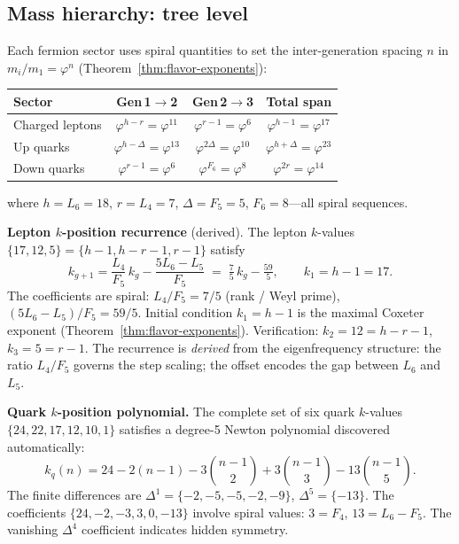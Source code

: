 \documentclass[12pt,a4paper]{article}
\begin{document}
\subsection{Mass hierarchy: tree level}

Each fermion sector uses spiral quantities to set the inter-generation spacing $n$ in $m_i/m_1 = \varphi^n$ (Theorem~\ref{thm:flavor-exponents}):

\begin{center}
\begin{tabular}{|l|cc|c|}
\hline
\textbf{Sector} & Gen\,1$\to$2 & Gen\,2$\to$3 & Total span \\
\hline
Charged leptons & $\varphi^{h-r} = \varphi^{11}$ & $\varphi^{r-1} = \varphi^{6}$ & $\varphi^{h-1} = \varphi^{17}$ \\
Up quarks & $\varphi^{h-\Delta} = \varphi^{13}$ & $\varphi^{2\Delta} = \varphi^{10}$ & $\varphi^{h+\Delta} = \varphi^{23}$ \\
Down quarks & $\varphi^{r-1} = \varphi^{6}$ & $\varphi^{F_6} = \varphi^{8}$ & $\varphi^{2r} = \varphi^{14}$ \\
\hline
\end{tabular}
\end{center}

\noindent where $h = L_6 = 18$, $r = L_4 = 7$, $\Delta = F_5 = 5$, $F_6 = 8$---all spiral sequences.

\textbf{Lepton $k$-position recurrence} (derived). The lepton $k$-values $\{17, 12, 5\} = \{h{-}1, h{-}r{-}1, r{-}1\}$ satisfy
\begin{equation}
k_{g+1} = \frac{L_4}{F_5}\,k_g - \frac{5L_6 - L_5}{F_5} \;=\; \tfrac{7}{5}\,k_g - \tfrac{59}{5}, \qquad k_1 = h - 1 = 17.
\end{equation}
The coefficients are spiral: $L_4/F_5 = 7/5$ (rank / Weyl prime), $(5L_6 - L_5)/F_5 = 59/5$. Initial condition $k_1 = h - 1$ is the maximal Coxeter exponent (Theorem~\ref{thm:flavor-exponents}). Verification: $k_2 = 12 = h - r - 1$, $k_3 = 5 = r - 1$. The recurrence is \emph{derived} from the eigenfrequency structure: the ratio $L_4/F_5$ governs the step scaling; the offset encodes the gap between $L_6$ and $L_5$.

\textbf{Quark $k$-position polynomial.} The complete set of six quark $k$-values $\{24, 22, 17, 12, 10, 1\}$ satisfies a degree-5 Newton polynomial discovered automatically:
\begin{equation}
k_q(n) = 24 - 2(n{-}1) - 3\binom{n{-}1}{2} + 3\binom{n{-}1}{3} - 13\binom{n{-}1}{5}.
\end{equation}
The finite differences are $\Delta^1 = \{-2, -5, -5, -2, -9\}$, $\Delta^5 = \{-13\}$. The coefficients $\{24, -2, -3, 3, 0, -13\}$ involve spiral values: $3 = F_4$, $13 = L_6 - F_5$. The vanishing $\Delta^4$ coefficient indicates hidden symmetry.
\end{document}
